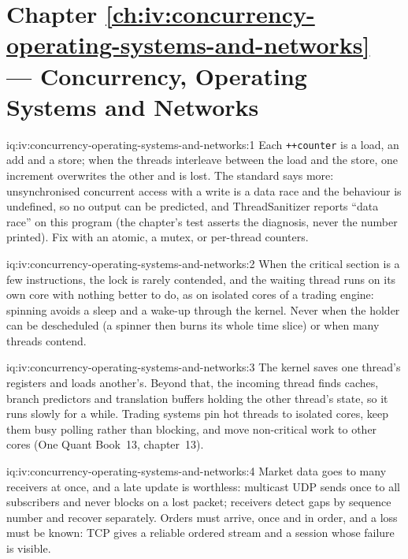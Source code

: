 \section*{Chapter \ref{ch:iv:concurrency-operating-systems-and-networks} --- Concurrency, Operating Systems and Networks}

\begin{solution}{iq:iv:concurrency-operating-systems-and-networks:1}
Each \texttt{++counter} is a load, an add and a store; when the threads interleave between the load and the store, one increment
overwrites the other and is lost. The standard says more: unsynchronised concurrent access with a write is a data race and the
behaviour is undefined, so no output can be predicted, and ThreadSanitizer reports ``data race'' on this program (the chapter's
test asserts the diagnosis, never the number printed). Fix with an atomic, a mutex, or per-thread counters.
\end{solution}

\begin{solution}{iq:iv:concurrency-operating-systems-and-networks:2}
When the critical section is a few instructions, the lock is rarely contended, and the waiting thread runs on its own core with
nothing better to do, as on isolated cores of a trading engine: spinning avoids a sleep and a wake-up through the kernel. Never
when the holder can be descheduled (a spinner then burns its whole time slice) or when many threads contend.
\end{solution}

\begin{solution}{iq:iv:concurrency-operating-systems-and-networks:3}
The kernel saves one thread's registers and loads another's. Beyond that, the incoming thread finds caches, branch predictors and
translation buffers holding the other thread's state, so it runs slowly for a while. Trading systems pin hot threads to isolated
cores, keep them busy polling rather than blocking, and move non-critical work to other cores (One Quant Book~13, chapter~13).
\end{solution}

\begin{solution}{iq:iv:concurrency-operating-systems-and-networks:4}
Market data goes to many receivers at once, and a late update is worthless: multicast UDP sends once to all subscribers and never
blocks on a lost packet; receivers detect gaps by sequence number and recover separately. Orders must arrive, once and in order, and
a loss must be known: TCP gives a reliable ordered stream and a session whose failure is visible.
\end{solution}

